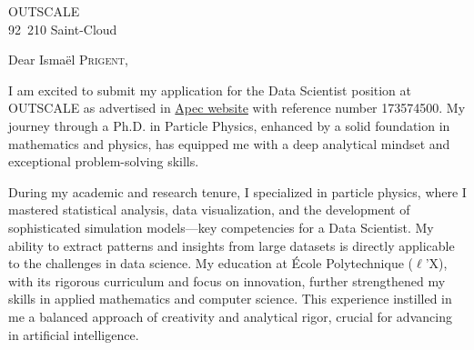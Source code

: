 \documentclass[11pt,a4paper]{lettre}
\begin{document}
\begin{letter} 
{OUTSCALE  \\
92~210 
Saint-Cloud }
\\
\address{Gaya \textsc{Benane}\\ 171 avenue de Luminy\\ 13~009~Marseille}  

\signature{Gaya \textsc{Benane}}
\nofax
\date{\today}

{}
\opening{\hspace{1em} Dear Ismaël \textsc{Prigent},}
\hspace{1em}
I am excited to submit my application for the Data Scientist position at OUTSCALE as advertised in \href{https://www.apec.fr}{Apec website} with reference number 173574500. My journey through a Ph.D. in Particle Physics, enhanced by a solid foundation in mathematics and physics, has equipped me with a deep analytical mindset and exceptional problem-solving skills.

\hspace{1em}
During my academic and research tenure, I specialized in particle physics, where I mastered statistical analysis, data visualization, and the development of sophisticated simulation models—key competencies for a Data Scientist. My ability to extract patterns and insights from large datasets is directly applicable to the challenges in data science.
My education at École Polytechnique ($\ell$’X), with its rigorous curriculum and focus on innovation, further strengthened my skills in applied mathematics and computer science. This experience instilled in me a balanced approach of creativity and analytical rigor, crucial for advancing in artificial intelligence.


\end{letter}
\end{document}
